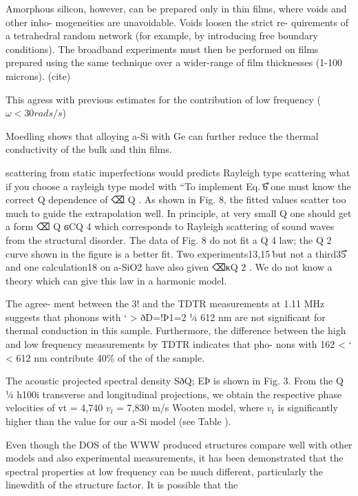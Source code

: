 \documentclass[aps,prb,twocolumn,superscriptaddress,footinbib,amsmath,amssymb,floatfix]{revtex4}
\begin{document}
Amorphous silicon, however, can be
prepared only in thin films, where voids and other inho-
mogeneities are unavoidable. Voids loosen the strict re-
quirements of a tetrahedral random network (for example,
by introducing free boundary conditions). 
The broadband experiments must then be performed on films prepared using 
the same technique over a wider-range of film thicknesses (1-100 microns).
(cite)

This agress with previous estimates for the contribution of low 
frequency ($\omega<30 rads/s$) \cite{love_estimate_1990}

Moedling shows that alloying a-Si with Ge can further reduce 
the thermal conductivity of the bulk and thin films.
\cite{bouchard_vibrational_1988,feldman_thermal_1993} 

scattering from static imperfections would predicts Rayleigh type 
scattering \cite{klemens_scattering_1955}
what if you choose a rayleigh type model with 
``To implement Eq. ͑6͒ one must know the
correct Q dependence of ⌫ Q . As shown in Fig. 8, the fitted
values scatter too much to guide the extrapolation well. In
principle, at very small Q one should get a form ⌫ Q ϭCQ 4
which corresponds to Rayleigh scattering of sound waves
from the structural disorder. The data of Fig. 8 do not fit a
Q 4 law; the Q 2 curve shown in the figure is a better fit. Two
experiments13,15 ͑but not a third35͒ and one calculation18 on
a-SiO2 have also given ⌫κQ 2 . We do not know a theory
which can give this law in a harmonic model.

The agree-
ment between the 3! and the TDTR measurements at
1.11 MHz suggests that phonons with ‘ > ðD=!Þ1=2 1⁄4
612 nm are not significant for thermal conduction in this
sample. Furthermore, the difference between the high and
low frequency measurements by TDTR indicates that pho-
nons with 162 < ‘ < 612 nm contribute 40$\%$ of the of
the sample.\cite{liu_high_2009}

The acoustic projected spectral density SðQ; EÞ is shown
in Fig. 3. From the Q 1⁄4 h100i transverse and longitudinal
projections, we obtain the respective phase velocities of
vt = 4,740 $v_l$ = 7,830 m/s Wooten model, where $v_t$ is 
significantly higher than the value for our a-Si model 
(see Table ).\cite{liu_high_2009} 

Even though the DOS of the WWW produced structures compare well with 
other models and also experimental measurements, it has been 
demonstrated that the spectral properties at low frequency can be 
much different, particularly the linewdith of the structure 
factor.\cite{liu_high_2009} It is possible that the 
\end{document}
